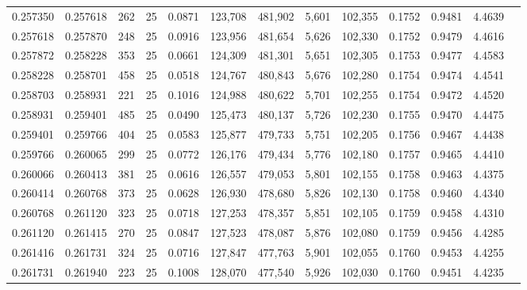 \begin{tabular}{rrrrrrrrrrrrr}
0.257350 & 0.257618 &   262 &  25 &                                     0.0871 & 123,708 & 481,902 &   5,601 & 102,355 & 0.1752 & 0.9481 & 4.4639 \\
0.257618 & 0.257870 &   248 &  25 &                                     0.0916 & 123,956 & 481,654 &   5,626 & 102,330 & 0.1752 & 0.9479 & 4.4616 \\
0.257872 & 0.258228 &   353 &  25 &                                     0.0661 & 124,309 & 481,301 &   5,651 & 102,305 & 0.1753 & 0.9477 & 4.4583 \\
0.258228 & 0.258701 &   458 &  25 &                                     0.0518 & 124,767 & 480,843 &   5,676 & 102,280 & 0.1754 & 0.9474 & 4.4541 \\
0.258703 & 0.258931 &   221 &  25 &                                     0.1016 & 124,988 & 480,622 &   5,701 & 102,255 & 0.1754 & 0.9472 & 4.4520 \\
0.258931 & 0.259401 &   485 &  25 &                                     0.0490 & 125,473 & 480,137 &   5,726 & 102,230 & 0.1755 & 0.9470 & 4.4475 \\
0.259401 & 0.259766 &   404 &  25 &                                     0.0583 & 125,877 & 479,733 &   5,751 & 102,205 & 0.1756 & 0.9467 & 4.4438 \\
0.259766 & 0.260065 &   299 &  25 &                                     0.0772 & 126,176 & 479,434 &   5,776 & 102,180 & 0.1757 & 0.9465 & 4.4410 \\
0.260066 & 0.260413 &   381 &  25 &                                     0.0616 & 126,557 & 479,053 &   5,801 & 102,155 & 0.1758 & 0.9463 & 4.4375 \\
0.260414 & 0.260768 &   373 &  25 &                                     0.0628 & 126,930 & 478,680 &   5,826 & 102,130 & 0.1758 & 0.9460 & 4.4340 \\
0.260768 & 0.261120 &   323 &  25 &                                     0.0718 & 127,253 & 478,357 &   5,851 & 102,105 & 0.1759 & 0.9458 & 4.4310 \\
0.261120 & 0.261415 &   270 &  25 &                                     0.0847 & 127,523 & 478,087 &   5,876 & 102,080 & 0.1759 & 0.9456 & 4.4285 \\
0.261416 & 0.261731 &   324 &  25 &                                     0.0716 & 127,847 & 477,763 &   5,901 & 102,055 & 0.1760 & 0.9453 & 4.4255 \\
0.261731 & 0.261940 &   223 &  25 &                                     0.1008 & 128,070 & 477,540 &   5,926 & 102,030 & 0.1760 & 0.9451 & 4.4235 \\

\end{tabular}
